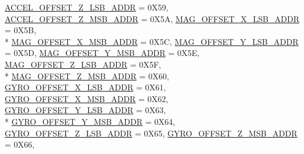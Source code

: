 \begin{DoxyCompactItemize}
\hyperlink{classAdafruit__BNO055_a37bdd791ec4916fb29933a5b78be0485afe669b51b1a24ec855cade38dd90c14f}{A\+C\+C\+E\+L\+\_\+\+O\+F\+F\+S\+E\+T\+\_\+\+Z\+\_\+\+L\+S\+B\+\_\+\+A\+D\+DR} = 0\+X59, 
\hyperlink{classAdafruit__BNO055_a37bdd791ec4916fb29933a5b78be0485a3e83f024a1cd15203011c9fb6ff82c20}{A\+C\+C\+E\+L\+\_\+\+O\+F\+F\+S\+E\+T\+\_\+\+Z\+\_\+\+M\+S\+B\+\_\+\+A\+D\+DR} = 0\+X5A, 
\hyperlink{classAdafruit__BNO055_a37bdd791ec4916fb29933a5b78be0485a5f08403caae91da3c1400663d0a699d9}{M\+A\+G\+\_\+\+O\+F\+F\+S\+E\+T\+\_\+\+X\+\_\+\+L\+S\+B\+\_\+\+A\+D\+DR} = 0\+X5B, 
\\*
\hyperlink{classAdafruit__BNO055_a37bdd791ec4916fb29933a5b78be0485a821605b292b685e8a1adaa8c47e51f82}{M\+A\+G\+\_\+\+O\+F\+F\+S\+E\+T\+\_\+\+X\+\_\+\+M\+S\+B\+\_\+\+A\+D\+DR} = 0\+X5C, 
\hyperlink{classAdafruit__BNO055_a37bdd791ec4916fb29933a5b78be0485a70945d5d295324d9d51e72de2a53627b}{M\+A\+G\+\_\+\+O\+F\+F\+S\+E\+T\+\_\+\+Y\+\_\+\+L\+S\+B\+\_\+\+A\+D\+DR} = 0\+X5D, 
\hyperlink{classAdafruit__BNO055_a37bdd791ec4916fb29933a5b78be0485a4d1a875e3f6d2cf79bb54d5ac0ac2f33}{M\+A\+G\+\_\+\+O\+F\+F\+S\+E\+T\+\_\+\+Y\+\_\+\+M\+S\+B\+\_\+\+A\+D\+DR} = 0\+X5E, 
\hyperlink{classAdafruit__BNO055_a37bdd791ec4916fb29933a5b78be0485acbd993f302ad780c35962b82627f4354}{M\+A\+G\+\_\+\+O\+F\+F\+S\+E\+T\+\_\+\+Z\+\_\+\+L\+S\+B\+\_\+\+A\+D\+DR} = 0\+X5F, 
\\*
\hyperlink{classAdafruit__BNO055_a37bdd791ec4916fb29933a5b78be0485a7d306e69d9028202556b60ec7aac5495}{M\+A\+G\+\_\+\+O\+F\+F\+S\+E\+T\+\_\+\+Z\+\_\+\+M\+S\+B\+\_\+\+A\+D\+DR} = 0\+X60, 
\hyperlink{classAdafruit__BNO055_a37bdd791ec4916fb29933a5b78be0485a27cee1097050facde2ff2a8cbfa97208}{G\+Y\+R\+O\+\_\+\+O\+F\+F\+S\+E\+T\+\_\+\+X\+\_\+\+L\+S\+B\+\_\+\+A\+D\+DR} = 0\+X61, 
\hyperlink{classAdafruit__BNO055_a37bdd791ec4916fb29933a5b78be0485a4c76d89b177bd0f11545e11236c8639b}{G\+Y\+R\+O\+\_\+\+O\+F\+F\+S\+E\+T\+\_\+\+X\+\_\+\+M\+S\+B\+\_\+\+A\+D\+DR} = 0\+X62, 
\hyperlink{classAdafruit__BNO055_a37bdd791ec4916fb29933a5b78be0485a3df1fb42f0a6124038a9363d730c05d8}{G\+Y\+R\+O\+\_\+\+O\+F\+F\+S\+E\+T\+\_\+\+Y\+\_\+\+L\+S\+B\+\_\+\+A\+D\+DR} = 0\+X63, 
\\*
\hyperlink{classAdafruit__BNO055_a37bdd791ec4916fb29933a5b78be0485a7fd08ded7a83052ab3c4a52ca9bcfa35}{G\+Y\+R\+O\+\_\+\+O\+F\+F\+S\+E\+T\+\_\+\+Y\+\_\+\+M\+S\+B\+\_\+\+A\+D\+DR} = 0\+X64, 
\hyperlink{classAdafruit__BNO055_a37bdd791ec4916fb29933a5b78be0485a81c2b9e5ecc14b329c0a21d6e363c8c7}{G\+Y\+R\+O\+\_\+\+O\+F\+F\+S\+E\+T\+\_\+\+Z\+\_\+\+L\+S\+B\+\_\+\+A\+D\+DR} = 0\+X65, 
\hyperlink{classAdafruit__BNO055_a37bdd791ec4916fb29933a5b78be0485a8927bab6ef05496739e3f54e866df55b}{G\+Y\+R\+O\+\_\+\+O\+F\+F\+S\+E\+T\+\_\+\+Z\+\_\+\+M\+S\+B\+\_\+\+A\+D\+DR} = 0\+X66, 

\end{DoxyCompactItemize}
